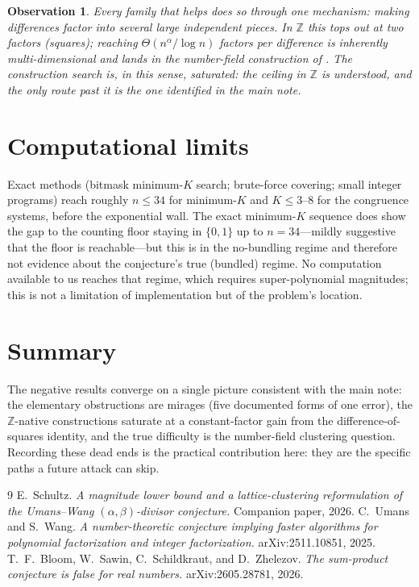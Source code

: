 \documentclass[11pt]{article}
\newtheorem{observation}{Observation}
\theoremstyle{definition}
\newcommand{\Z}{\mathbb{Z}}
\begin{document}
\begin{observation}
Every family that helps does so through one mechanism: making differences factor
into several large independent pieces. In $\Z$ this tops out at two factors
(squares); reaching $\Theta(n^{\alpha}/\log n)$ factors per difference is inherently
multi-dimensional and lands in the number-field construction of \cite{BSSZ}. The
construction search is, in this sense, saturated: the ceiling in $\Z$ is understood,
and the only route past it is the one identified in the main note.
\end{observation}

\section{Computational limits}

Exact methods (bitmask minimum-$K$ search; brute-force covering; small integer
programs) reach roughly $n\le 34$ for minimum-$K$ and $K\le 3$--$8$ for the
congruence systems, before the exponential wall. The exact minimum-$K$ sequence
does show the gap to the counting floor staying in $\{0,1\}$ up to $n=34$---mildly
suggestive that the floor is reachable---but this is in the no-bundling regime and
therefore not evidence about the conjecture's true (bundled) regime. No computation
available to us reaches that regime, which requires super-polynomial magnitudes;
this is not a limitation of implementation but of the problem's location.

\section{Summary}
The negative results converge on a single picture consistent with the main note: the
elementary obstructions are mirages (five documented forms of one error), the
$\Z$-native constructions saturate at a constant-factor gain from the difference-of-
squares identity, and the true difficulty is the number-field clustering question.
Recording these dead ends is the practical contribution here: they are the specific
paths a future attack can skip.

\begin{thebibliography}{9}
 E.~Schultz. \emph{A magnitude lower bound and a lattice-clustering
reformulation of the Umans--Wang $(\alpha,\beta)$-divisor conjecture.} Companion
paper, 2026.
 C.~Umans and S.~Wang. \emph{A number-theoretic conjecture implying
faster algorithms for polynomial factorization and integer factorization.}
arXiv:2511.10851, 2025.
 T.~F.~Bloom, W.~Sawin, C.~Schildkraut, and D.~Zhelezov.
\emph{The sum-product conjecture is false for real numbers.} arXiv:2605.28781, 2026.
\end{thebibliography}
\end{document}
